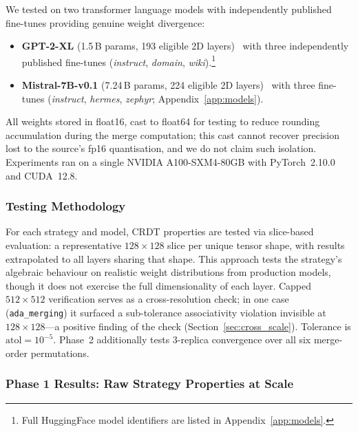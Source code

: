 \documentclass[10pt,letterpaper]{article}
\begin{document}
We tested on two transformer language models with independently published fine-tunes providing genuine weight divergence:
\begin{itemize}[leftmargin=*]
\item \textbf{GPT-2-XL} (1.5\,B params, 193 eligible 2D layers)~\cite{radford2019language} with three independently published fine-tunes (\emph{instruct}, \emph{domain}, \emph{wiki}).\footnote{\label{fn:models}Full HuggingFace model identifiers are listed in Appendix~\ref{app:models}.}

\item \textbf{Mistral-7B-v0.1} (7.24\,B params, 224 eligible 2D layers)~\cite{jiang2023mistral} with three fine-tunes (\emph{instruct}, \emph{hermes}, \emph{zephyr}; Appendix~\ref{app:models}).
\end{itemize}
All weights stored in float16, cast to float64 for testing to reduce rounding accumulation during the merge computation; this cast cannot recover precision lost to the source's fp16 quantisation, and we do not claim such isolation.
Experiments ran on a single NVIDIA A100-SXM4-80GB with PyTorch~2.10.0 and CUDA~12.8.

\subsubsection{Testing Methodology}\label{sec:methodology}

For each strategy and model, CRDT properties are tested via slice-based evaluation: a representative $128\times 128$ slice per unique tensor shape, with results extrapolated to all layers sharing that shape.
This approach tests the strategy's algebraic behaviour on realistic weight distributions from production models, though it does not exercise the full dimensionality of each layer.
Capped $512\times 512$ verification serves as a cross-resolution check; in one case (\texttt{ada\_merging}) it surfaced a sub-tolerance associativity violation invisible at $128\times 128$---a positive finding of the check (Section~\ref{sec:cross_scale}).
Tolerance is $\mathrm{atol}=10^{-5}$.
Phase~2 additionally tests 3-replica convergence over all six merge-order permutations.

\subsubsection{Phase 1 Results: Raw Strategy Properties at Scale}\label{sec:prod_phase1}
\end{document}
